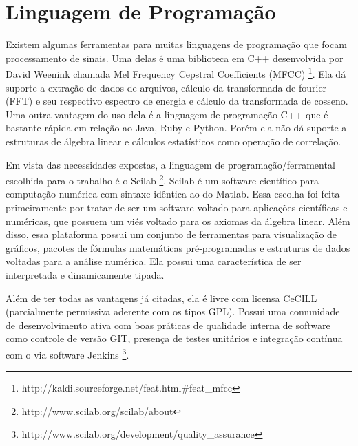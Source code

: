 \section{Linguagem de Programação}
\label{sec:linguagemprogramacao}

Existem algumas ferramentas para muitas linguagens de programação que focam processamento de sinais. Uma delas é uma biblioteca em C++ desenvolvida por David Weenink chamada Mel Frequency Cepstral Coefficients (MFCC) \footnote{http://kaldi.sourceforge.net/feat.html\#feat\_mfcc}. Ela dá suporte a extração de dados de arquivos, cálculo da transformada de fourier (FFT) e seu respectivo espectro de energia e cálculo da transformada de cosseno. Uma outra vantagem do uso dela é a linguagem de programação C++ que é bastante rápida em relação ao Java, Ruby e Python. Porém ela não dá suporte a estruturas de álgebra linear e cálculos estatísticos como operação de correlação.

Em vista das necessidades expostas, a linguagem de programação/ferramental escolhida para o trabalho é o Scilab \footnote{http://www.scilab.org/scilab/about}. Scilab é um software científico para computação numérica com sintaxe idêntica ao do Matlab. Essa escolha foi feita primeiramente por tratar de ser um software voltado para aplicações científicas e numéricas, que possuem um viés voltado para os axiomas da álgebra linear. Além disso, essa plataforma possui um conjunto de ferramentas para visualização de gráficos, pacotes de fórmulas matemáticas pré-programadas e estruturas de dados voltadas para a análise numérica. Ela possui uma característica de ser interpretada e dinamicamente tipada.

Além de ter todas as vantagens já citadas, ela é livre com licensa CeCILL (parcialmente permissiva aderente com os tipos GPL). Possui uma comunidade de desenvolvimento ativa com boas práticas de qualidade interna de software como controle de versão GIT, presença de testes unitários e integração contínua com o via software Jenkins \footnote{http://www.scilab.org/development/quality{\_}assurance}.

